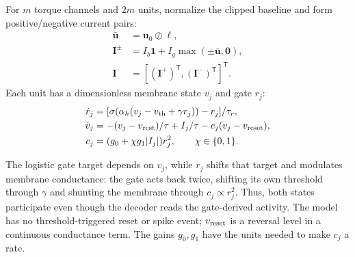 \documentclass[letterpaper, 10 pt, conference]{ieeeconf}
\newcommand{\T}{^{\mathsf T}}
\begin{document}
For $m$ torque channels and $2m$ units, normalize the clipped baseline and
form positive/negative current pairs:
\begin{equation}
 \begin{aligned}
 \bar{\bm u}&=\bm u_0\oslash\bm\ell,\\
 \bm I^{\pm}&=I_b\bm1+I_g\max(\pm\bar{\bm u},\bm0),\\
 \bm I&=[(\bm I^+)\T,(\bm I^-)\T]\T.
 \end{aligned}
 \label{eq:encoding}
\end{equation}
Each unit has a dimensionless membrane state $v_j$ and gate $r_j$:
\begin{align}
 \dot r_j&=[\sigma(\alpha_h(v_j-v_{\rm th}+\gamma r_j))-r_j]/\tau_r,\\
 \dot v_j&=-(v_j-v_{\rm rest})/\tau+I_j/\tau-c_j(v_j-v_{\rm reset}),\\
 c_j&=(g_0+\chi g_1|I_j|)r_j^2,\qquad \chi\in\{0,1\}.
 \label{eq:cmg}
\end{align}

%
The logistic gate target depends on $v_j$, while $r_j$ shifts that target
and modulates membrane conductance: the gate acts back twice, shifting its own threshold through $\gamma$ and shunting the membrane through $c_j\propto r_j^2$. Thus, both states participate even
though the decoder reads the gate-derived activity. The model has no
threshold-triggered reset or spike event; $v_{\rm reset}$ is a reversal
level in a continuous conductance term. The gains $g_0,g_1$ have the units
needed to make $c_j$ a rate.
\end{document}
